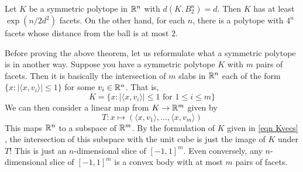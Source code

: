 \begin{ftheo}
    \label{approximating sphere to polytope}
    Let $K$ be a symmetric polytope in $\mathbb{R}^n$ with $d(K,B_2^n)=d$. Then $K$ has at least $\exp(n/2d^2)$ facets. On the other hand, for each $n$, there is a polytope with $4^n$ facets whose distance from the ball is at most $2$.
\end{ftheo}
Before proving the above theorem, let us reformulate what a symmetric polytope is in another way. Suppose you have a symmetric polytope $K$ with $m$ pairs of facets. Then it is basically the intersection of $m$ slabs in $\mathbb{R}^n$ each of the form $\{x:|\langle x, v_i\rangle| \leq 1\}$ for some $v_i\in\mathbb{R}^n$. That is,
\begin{equation}
\label{eqn Kvecs}
    K = \{x : |\langle x, v_i\rangle|\leq 1 \text{ for }1\leq i\leq m\}
\end{equation}
We can then consider a linear map from $K\to \mathbb{R}^m$ given by
\[ T: x \mapsto (\langle x,v_1\rangle,\ldots,\langle x,v_m\rangle) \]
This maps $\mathbb{R}^n$ to a subspace of $\mathbb{R}^m$. By the formulation of $K$ given in \ref{eqn Kvecs} , the intersection of this subspace with the unit cube is just the image of $K$ under $T$! This is just an $n$-dimensional slice of $[-1,1]^m$. Even conversely, any $n$-dimensional slice of $[-1,1]^m$ is a convex body with at most $m$ pairs of facets.
